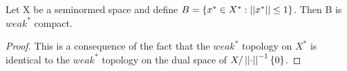 \begin{cor}
    Let X be a seminormed space and define $B=\{x^* \in X^*: \left|\left| x^* \right|\right| \leq 1\}$. Then B is $weak^*$ compact. 
    \begin{proof} 
        This is  a consequence of the fact that the $weak^*$ topology on $X^*$ is identical to the $weak^*$ topology on the dual space of $X/\left|\left| \cdot \right|\right|^{-1}\{0\}$. 
    \end{proof} 
\end{cor} 
